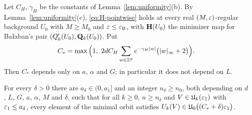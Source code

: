 Let $C_H$, $\gamma_H$ be the constants of Lemma~\ref{lem:uniformity}(b). By Lemma~\ref{lem:uniformity}(c), \eqref{eq:H-pointwise} holds at every real $(M,\varepsilon)$-regular background $U_0$ with $M\ge M_0$ and $\varepsilon\le\varepsilon_{\rm B}$, with $\mathbf H(U_0)$ the minimizer map for Ba\l aban's pair $(Q'_k(U_0),\mathbf Q_k(U_0))$. Put
\[
C_*=\max\Big(1,\ 2dC_H\sum_{w\in\Z^d}e^{-\gamma_H|w|}\big(|w|_\infty+2\big)\Big).
\]
Then $C_*$ depends only on $a$, $\alpha$ and $G$; in particular it does not depend on $L$.


\begin{proposition}\label{prop:sharp-curvature}
For every $\delta>0$ there are $a_\delta\in(0,a_1]$ and an integer $n_\delta\ge n_0$, both depending on $d$, $L$, $G$, $a$, $\alpha$, $M$ and $\delta$, such that for all $k\ge0$, $n\ge n_\delta$ and $V\in\mathfrak U_k(\varepsilon_1)$ with $\varepsilon_1\le a_\delta$, every element of the minimal orbit satisfies $U_k(V)\in\mathfrak U_0\big((C_*+\delta)\varepsilon_1\big)$.
\end{proposition}

